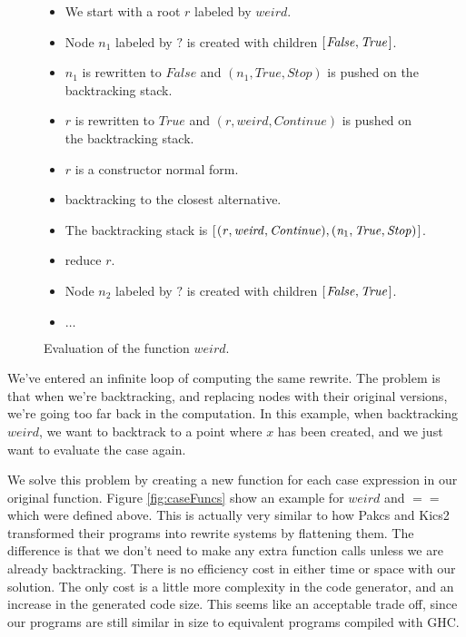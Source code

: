 \documentclass{book}
\theoremstyle{definition}
\newcommand{\Conid}[1]{\mathit{#1}}
\newcommand{\Varid}[1]{\mathit{#1}}
\begin{document}
\begin{figure}
\noindent
\begin{itemize}
   \item We start with a root \ensuremath{\Varid{r}} labeled by \ensuremath{\Varid{weird}}.
   \item Node \ensuremath{\Varid{n}_{\mathrm{1}}} labeled by \ensuremath{\mathbin{?}} is created with children \ensuremath{[\mskip1.5mu \Conid{False},\Conid{True}\mskip1.5mu]}.
   \item \ensuremath{\Varid{n}_{\mathrm{1}}} is rewritten to \ensuremath{\Conid{False}} and \ensuremath{(\Varid{n}_{\mathrm{1}},\Conid{True},\Conid{Stop})} is pushed on the backtracking stack.
   \item \ensuremath{\Varid{r}} is rewritten to \ensuremath{\Conid{True}} and \ensuremath{(\Varid{r},\Varid{weird},\Conid{Continue})} is pushed on the backtracking stack.
   \item \ensuremath{\Varid{r}} is a constructor normal form.
   \item backtracking to the closest alternative.
   \item The backtracking stack is \ensuremath{[\mskip1.5mu (\Varid{r},\Varid{weird},\Conid{Continue}),(\Varid{n}_{\mathrm{1}},\Conid{True},\Conid{Stop})\mskip1.5mu]}.
   \item reduce \ensuremath{\Varid{r}}.
   \item Node \ensuremath{\Varid{n}_{\mathrm{2}}} labeled by \ensuremath{\mathbin{?}} is created with children \ensuremath{[\mskip1.5mu \Conid{False},\Conid{True}\mskip1.5mu]}.
   \item $\ldots$
\end{itemize}
\caption{Evaluation of the function \ensuremath{\Varid{weird}}.}
\label{fig:weirdEval}
\end{figure}


We've entered an infinite loop of computing the same rewrite.
The problem is that when we're backtracking,
and replacing nodes with their original versions, we're going too far
back in the computation.
In this example, when backtracking \ensuremath{\Varid{weird}}, we want to backtrack to a point
where \ensuremath{\Varid{x}} has been created, and we just want to evaluate the case again.

We solve this problem by creating a new function for each case expression in our original function.
Figure \ref{fig:caseFuncs} show an example for \ensuremath{\Varid{weird}} and \ensuremath{\Varid{==}} which were defined above.
This is actually very similar to how Pakcs and Kics2 transformed their programs into
rewrite systems by flattening them.
The difference is that we don't need to make any extra function calls unless
we are already backtracking.
There is no efficiency cost in either time or space with our solution.
The only cost is a little more complexity in the code generator,
and an increase in the generated code size.
This seems like an acceptable trade off, 
since our programs are still similar in size to equivalent programs compiled with GHC.
\end{document}
